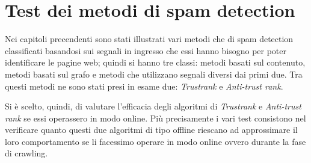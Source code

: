 \chapter{Test dei metodi di spam detection}
Nei capitoli precendenti sono stati illustrati vari metodi che di spam detection classificati basandosi sui segnali in ingresso che essi hanno bisogno per poter identificare le pagine web; quindi si hanno tre classi: metodi basati sul contenuto, metodi basati sul grafo e metodi che utilizzano segnali diversi dai primi due. Tra questi metodi ne sono stati presi in esame due: \textit{Trustrank} e \textit{Anti-trust rank}. 

Si è scelto, quindi, di valutare l'efficacia degli algoritmi di \textit{Trustrank} e \textit{Anti-trust rank} se essi operassero in modo online. Più precisamente i vari test consistono nel verificare quanto questi due algoritmi di tipo offline riescano ad approssimare il loro comportamento se li facessimo operare in modo online ovvero durante la fase di crawling.

